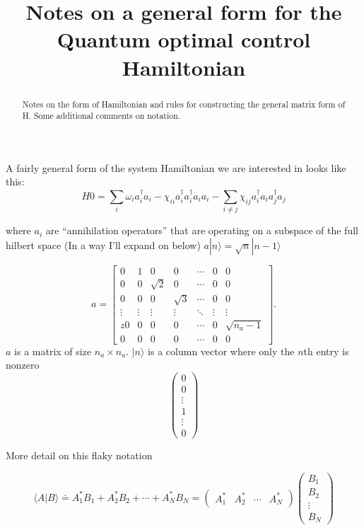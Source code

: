 \documentclass{article}
\begin{document}
\title{Notes on a general form for the Quantum optimal control Hamiltonian}

\maketitle

\begin{abstract}
  Notes on the form of Hamiltonian and rules for constructing the general matrix form of H.  Some additional comments on notation.
\end{abstract}

A fairly general form of the system Hamiltonian we are interested in looks like this:
$$
H0 = \sum_i \omega_i a_i^\dagger a_i -\chi_{ii} a_i^\dagger a_i^\dagger a_i a_i -  \sum_{ i\ne j} \chi_{ij}  a_i^\dagger a_i a_j^\dagger  a_j 
$$

where $a_i$ are ``annihilation operators'' that are operating on a subspace of the full hilbert space (In a way I'll expand on below)
$a | n \rangle = \sqrt{n} |n-1\rangle$ 


\begin{equation}
  a = \begin{bmatrix}
    0 & 1 & 0 & 0 & \dotsm & 0 & 0\\
    0 & 0 & \sqrt{2} & 0 & \dotsm & 0 & 0\\
    0 & 0 & 0 & \sqrt{3} & \dotsm & 0 & 0\\
    \vdots & \vdots & \vdots & \vdots & \ddots & \vdots & \vdots \\z
    0 & 0 & 0 & 0 & \dotsm & 0 & \sqrt{n_a-1} \\
    0 & 0 & 0 & 0 & \dotsm & 0 & 0
    \end{bmatrix}.
\end{equation}
$a$ is a matrix of size $n_a \times n_a$. $|n\rangle$ is a column vector where only the $n$th entry is nonzero
$$
\begin{pmatrix} 0 \\ 0 \\ \vdots \\ 1 \\ \vdots \\ 0\end{pmatrix}
$$

More detail on this flaky notation

$$
\langle A | B \rangle \doteq A_1^* B_1 + A_2^* B_2 + \cdots + A_N^* B_N =
\begin{pmatrix} A_1^* & A_2^* & \cdots & A_N^* \end{pmatrix}
\begin{pmatrix} B_1 \\ B_2 \\ \vdots \\ B_N \end{pmatrix}
$$
\end{document}
